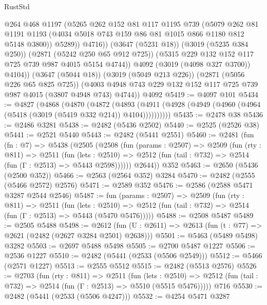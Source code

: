 \begin{lexlean}{RustStd}
\begin{coremodule}
                  @264
                  @468
                  @1197
                  (@5265
                    @262
                    @152
                    @81
                    @117
                    @1195
                    @739
                    (@5079
                      @262
                      @81
                      @1191
                      @1193
                      (@4034 @5018 @743 @159 @86 @81 @1015 @866 @1180 @812 @5148 @3800))
                    @5289))
                @4716))
            (@3647 (@5231 @18))
            (@3019 (@5235 @384 @250))
            (@2871 (@5242 @250 @65 @912 @725))
            (@5315 @229 @132 @152 @117 @725 @739 @987 @4015 @5154 @4744))
          @4092
          (@3019 (@4098 @327 @3700))
          @4104))
      (@3647 (@5044 @18))
      (@3019 (@5049 @213 @226))
      (@2871 (@5056 @226 @65 @825 @725))
      (@4003 @4948 @743 @229 @132 @152 @117 @725 @739 @987 @4015 (@3807 @4948 @743) @4744))
    @4092
@5419 := @4097 @101
@5434 := @4827
    (@4868
      (@4870
        (@4872
          (@4893 (@4911 (@4928 (@4949 (@4960 (@4964 (@5418 (@3019 (@5419 @332 @214)) @4104))))))))))
@5435 := @2478 @38
@5436 := @2486 @3281
@5438 := @2482 (@5436 @2502)
@5440 := @2525 (@2526 @38)
@5441 := @2521 @5440
@5443 := @2482 (@5441 @2551)
@5460 := @2481
    (fun (fn : @7) =>
    @5438
      (@2505
        (@2508
          (fun (params : @2507) =>
          @2509
            (fun (rty : @811) =>
            @2511
              (fun (lets : @2510) =>
              @2512 (fun (tail : @732) => @2514 (fun (Γ : @2513) => @5443 @2598))))))
        @2644))
    @352
@5463 := @2650 (@5436 (@2500 @352))
@5466 := @2563 (@2564 @352) @3284
@5470 := @2482 (@2555 (@5466 @2572) @2576)
@5471 := @2589 @352
@5476 := @2586 (@2588 @5471 @3287 @2544 @2546)
@5487 := fun (params : @2507) =>
  @2509
    (fun (rty : @811) =>
    @2511
      (fun (lets : @2510) =>
      @2512 (fun (tail : @732) => @2514 (fun (Γ : @2513) => @5443 (@5470 @5476)))))
@5488 := @2508 @5487
@5489 := @2505 @5488
@5498 := @2612 (fun (U : @2611) => @2613 (fun (t : @77) => @2621 (@2482 (@2627 @3284 @2501) @2638)))
@5501 := @5463 (@5489 @5498) @3282
@5503 := @2697 @5488 @5498
@5505 := @2700 @5487 @1227
@5506 := @2536 @1227
@5510 := @2482 (@5441 (@2533 (@5506 @2549)))
@5512 := @5466 (@2571 @1227)
@5513 := @2555 @5512
@5515 := @2482 (@5513 @2576)
@5526 := @2703
    (fun (rty : @811) =>
    @2511
      (fun (lets : @2510) =>
      @2512 (fun (tail : @732) => @2514 (fun (Γ : @2513) => @5510 (@5515 @5476)))))
    @716
@5530 := @2482 (@5441 (@2533 (@5506 @4247)))
@5532 := @4254 @5471 @3287

\end{coremodule}
\end{lexlean}
